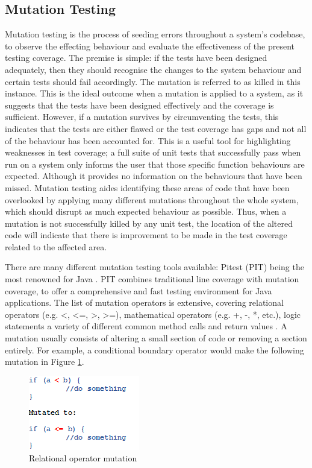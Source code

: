 \documentclass[a4paper,12pt]{article}
\begin{document}
\subsection{Mutation Testing}
Mutation testing is the process of seeding errors throughout a system’s codebase, to observe the effecting behaviour and evaluate the effectiveness of the present testing coverage. The premise is simple: if the tests have been designed adequately, then they should recognise the changes to the system behaviour and certain tests should fail accordingly. The mutation is referred to as killed in this instance. This is the ideal outcome when a mutation is applied to a system, as it suggests that the tests have been designed effectively and the coverage is sufficient. However, if a mutation survives by circumventing the tests, this indicates that the tests are either flawed or the test coverage has gaps and not all of the behaviour has been accounted for. This is a useful tool for highlighting weaknesses in test coverage; a full suite of unit tests that successfully pass when run on a system only informs the user that those specific function behaviours are expected. Although it provides no information on the behaviours that have been missed. Mutation testing aides identifying these areas of code that have been overlooked by applying many different mutations throughout the whole system, which should disrupt as much expected behaviour as possible. Thus, when a mutation is not successfully killed by any unit test, the location of the altered code will indicate that there is improvement to be made in the test coverage related to the affected area.

There are many different mutation testing tools available: Pitest (PIT) being the most renowned for Java \citep{pit19}. PIT combines traditional line coverage with mutation coverage, to offer a comprehensive and fast testing environment for Java applications. The list of mutation operators is extensive, covering relational operators (e.g. \textless, \textless=, \textgreater, \textgreater=), mathematical operators (e.g. +, -, *, etc.), logic statements a variety of different common method calls and return values \citep{pit19}. A mutation usually consists of altering a small section of code or removing a section entirely. For example, a conditional boundary operator would make the following mutation  in Figure \ref{fig:mutation}. 

\begin{figure}[h]
    \includegraphics{mutation.png}
    \caption{Relational operator mutation}
    \label{fig:mutation}
\end{figure}
    
\end{document}

